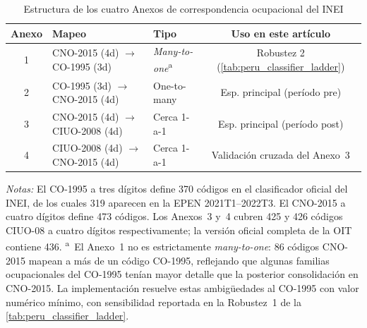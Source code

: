 \begin{table}[H]
\centering
\small
\begin{threeparttable}
\caption{Estructura de los cuatro Anexos de correspondencia ocupacional del INEI}
\label{tab:peru_crosswalks}
\begin{tabular}{cllc}
\toprule
Anexo & Mapeo & Tipo & Uso en este art\'{i}culo \\
\midrule
1 & CNO-2015 (4d) $\to$ CO-1995 (3d) & \emph{Many-to-one}\textsuperscript{a} & Robustez 2 (\cref{tab:peru_classifier_ladder}) \\
2 & CO-1995 (3d) $\to$ CNO-2015 (4d) & One-to-many         & Esp. principal (per\'{i}odo pre) \\
3 & CNO-2015 (4d) $\to$ CIUO-2008 (4d) & Cerca 1-a-1 & Esp. principal (per\'{i}odo post) \\
4 & CIUO-2008 (4d) $\to$ CNO-2015 (4d) & Cerca 1-a-1 & Validaci\'{o}n cruzada del Anexo~3 \\
\bottomrule
\end{tabular}
\begin{tablenotes}[flushleft]
\footnotesize
\item \emph{Notas:} El CO-1995 a tres d\'{i}gitos define 370 c\'{o}digos en el clasificador oficial del INEI, de los cuales 319 aparecen en la EPEN 2021T1--2022T3. El CNO-2015 a cuatro d\'{i}gitos define 473 c\'{o}digos. Los Anexos~3 y~4 cubren 425 y 426 c\'{o}digos CIUO-08 a cuatro d\'{i}gitos respectivamente; la versi\'{o}n oficial completa de la OIT contiene 436. \textsuperscript{a}~El Anexo~1 no es estrictamente \emph{many-to-one}: 86 c\'{o}digos CNO-2015 mapean a m\'{a}s de un c\'{o}digo CO-1995, reflejando que algunas familias ocupacionales del CO-1995 ten\'{i}an mayor detalle que la posterior consolidaci\'{o}n en CNO-2015. La implementaci\'{o}n resuelve estas ambig\"uedades al CO-1995 con valor num\'{e}rico m\'{i}nimo, con sensibilidad reportada en la Robustez~1 de la \cref{tab:peru_classifier_ladder}.
\end{tablenotes}
\end{threeparttable}
\end{table}

